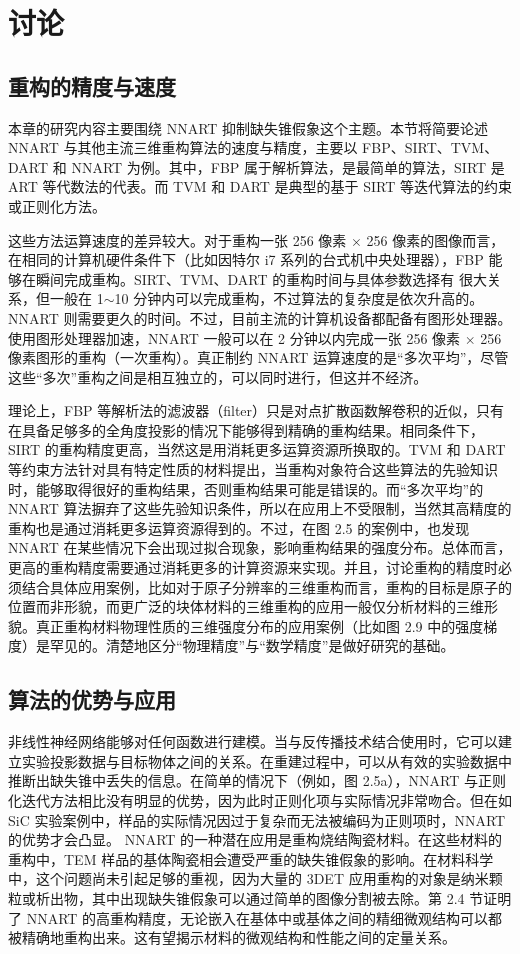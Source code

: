 \section{讨论}

\subsection{重构的精度与速度}
本章的研究内容主要围绕 NNART 抑制缺失锥假象这个主题。本节将简要论述 NNART 与其他主流三维重构算法的速度与精度，主要以 FBP、SIRT、TVM、DART 和 NNART 为例。其中，FBP 属于解析算法，是最简单的算法，SIRT 是 ART 等代数法的代表。而 TVM 和 DART 是典型的基于 SIRT 等迭代算法的约束或正则化方法。

这些方法运算速度的差异较大。对于重构一张 256 像素 $\times$ 256 像素的图像而言，在相同的计算机硬件条件下（比如因特尔 i7 系列的台式机中央处理器），FBP 能够在瞬间完成重构。SIRT、TVM、DART 的重构时间与具体参数选择有
很大关系，但一般在 1$\sim$10 分钟内可以完成重构，不过算法的复杂度是依次升高的。NNART 则需要更久的时间。不过，目前主流的计算机设备都配备有图形处理器。使用图形处理器加速，NNART 一般可以在 2 分钟以内完成一张 256 像素 $\times$ 256 像素图形的重构（一次重构）。真正制约 NNART 运算速度的是“多次平均”，尽管这些“多次”重构之间是相互独立的，可以同时进行，但这并不经济。

理论上，FBP 等解析法的滤波器（filter）只是对点扩散函数解卷积的近似，只有在具备足够多的全角度投影的情况下能够得到精确的重构结果。相同条件下，SIRT 的重构精度更高，当然这是用消耗更多运算资源所换取的。TVM 和 DART 等约束方法针对具有特定性质的材料提出，当重构对象符合这些算法的先验知识时，能够取得很好的重构结果，否则重构结果可能是错误的。而“多次平均”的 NNART 算法摒弃了这些先验知识条件，所以在应用上不受限制，当然其高精度的重构也是通过消耗更多运算资源得到的。不过，在图 2.5 的案例中，也发现 NNART 在某些情况下会出现过拟合现象，影响重构结果的强度分布。总体而言，更高的重构精度需要通过消耗更多的计算资源来实现。并且，讨论重构的精度时必须结合具体应用案例，比如对于原子分辨率的三维重构而言，重构的目标是原子的位置而非形貌，而更广泛的块体材料的三维重构的应用一般仅分析材料的三维形貌。真正重构材料物理性质的三维强度分布的应用案例（比如图 2.9 中的强度梯度）是罕见的。清楚地区分“物理精度”与“数学精度”是做好研究的基础。

\subsection{算法的优势与应用}
非线性神经网络能够对任何函数进行建模。当与反传播技术结合使用时，它可以建立实验投影数据与目标物体之间的关系。在重建过程中，可以从有效的实验数据中推断出缺失锥中丢失的信息。在简单的情况下（例如，图 2.5a），NNART 与正则化迭代方法相比没有明显的优势，因为此时正则化项与实际情况非常吻合。但在如 SiC 实验案例中，样品的实际情况因过于复杂而无法被编码为正则项时，NNART 的优势才会凸显。
NNART 的一种潜在应用是重构烧结陶瓷材料。在这些材料的重构中，TEM 样品的基体陶瓷相会遭受严重的缺失锥假象的影响。在材料科学中，这个问题尚未引起足够的重视，因为大量的 3DET 应用重构的对象是纳米颗粒或析出物，其中出现缺失锥假象可以通过简单的图像分割被去除。第 2.4 节证明了 NNART 的高重构精度，无论嵌入在基体中或基体之间的精细微观结构可以都被精确地重构出来。这有望揭示材料的微观结构和性能之间的定量关系。

